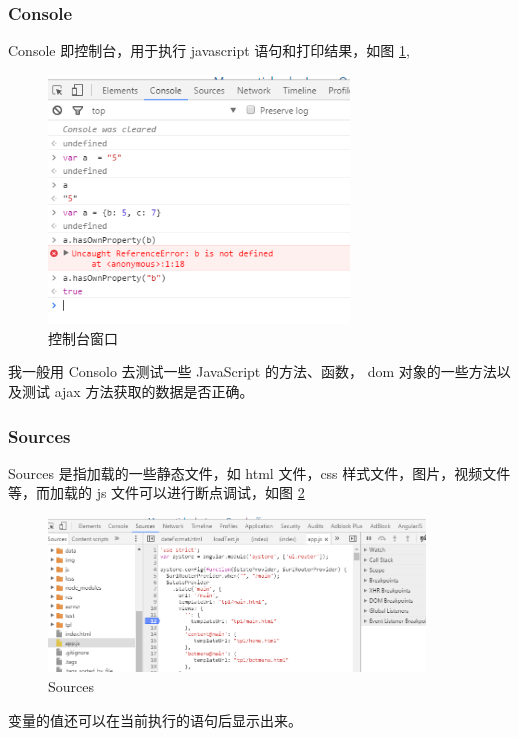 \documentclass[UTF8]{ctexbook}
\begin{document}
{{            \subsubsection{Console}
              \label{subsubsec:console}
                Console 即控制台，用于执行 javascript 语句和打印结果，如图 \ref{fig:cr_console},
                \begin{figure}[htbp]
                  \centering
                  \includegraphics[width=8cm]{./img/cr_console.png}
                  \caption{控制台窗口}
                  \label{fig:cr_console}
                \end{figure}
                我一般用 Consolo 去测试一些 JavaScript 的方法、函数， dom 对象的一些方法以及测试 ajax 方法获取的数据是否正确。

            \subsubsection{Sources}
              \label{subsubsec:sources}
                Sources 是指加载的一些静态文件，如 html 文件，css 样式文件，图片，视频文件等，而加载的 js 文件可以进行断点调试，如图 \ref{fig:cr_sources}
                \begin{figure}[htbp]
                  \centering
                  \includegraphics[width=10cm]{./img/cr_sources.png}
                  \caption{Sources}
                  \label{fig:cr_sources}
                \end{figure}
                变量的值还可以在当前执行的语句后显示出来。

}}
\end{document}
